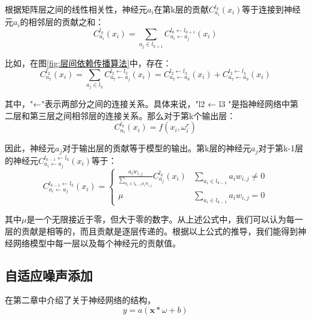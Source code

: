 根据矩阵层之间的线性相关性，神经元$a_{i}$在第k层的贡献$C_{a_{i}}^{l_{k}}\left(x_{i}\right)$等于连接到神经元$a_{i}$的相邻层的贡献之和：
\begin{equation}\label{eq:层间传播1}
C_{a_{i}}^{l_{k}}\left(x_{i}\right)=\sum_{a_{j} \in l_{k+1}} C_{a_{i} \leftarrow a_{j}}^{l_{k} \leftarrow l_{k+1}}\left(x_{i}\right)
\end{equation}

比如，在图\ref{fig:层间依赖传播算法}中，存在：
\begin{equation}\label{eq:层间传播2}
C_{a_{7}}^{l_{2}}\left(x_{i}\right)=\sum_{a_{j} \in l_{3}} C_{a_{7} \leftarrow a_{j}}^{l_{2} \leftarrow l_{3}}\left(x_{i}\right)=C_{a_{7} \leftarrow a_{8}}^{l_{2} \leftarrow l_{3}}\left(x_{i}\right)+C_{a_{7} \leftarrow a_{9}}^{l_{2} \leftarrow l_{3}}\left(x_{i}\right)
\end{equation}

其中，"←"表示两部分之间的连接关系。具体来说，"l2 ← l3 "是指神经网络中第二层和第三层之间相邻层的连接关系。那么对于第k个输出层：
\begin{equation}
C_{a_{i}}^{l_{k}}\left(x_{i}\right)=f\left(x_{i},\omega_{i}^{r}\right)
\end{equation}

因此，神经元$a_{j}$对于输出层的贡献等于模型的输出。第k层的神经元$a_{j}$对于第k-1层的神经元$C_{a_{i} \leftarrow a_{j}}^{l_{k-1} \leftarrow l_{k}}\left(x_{i}\right)$等于：
\begin{equation}
C_{a_{i} \leftarrow a_{j}}^{l_{k-1} \leftarrow l_{k}}\left(x_{i}\right)=\left\{\begin{array}{cc}\frac{a_{i} w_{i, j}}{\sum_{a_{i} \in l_{k-1} a_{i} w_{i, j}}} C_{a_{j}}^{l_{k}}\left(x_{i}\right) & \sum_{a_{i} \in l_{k-1}} a_{i} w_{i, j} \neq 0 \\ \mu & \sum_{a_{i} \in l_{k-1}} a_{i} w_{i, j}=0\end{array}\right.
\end{equation}

其中$\mu$是一个无限接近于零，但大于零的数字。从上述公式中，我们可以认为每一层的贡献是相等的，而且贡献是逐层传递的。根据以上公式的推导，我们能得到神经网络模型中每一层以及每个神经元的贡献值。


\subsection{自适应噪声添加}
在第二章中介绍了关于神经网络的结构，
\begin{equation}\label{eq:神经网络参数传递}
y=a(\mathbf{x} * \omega+b)
\end{equation}

